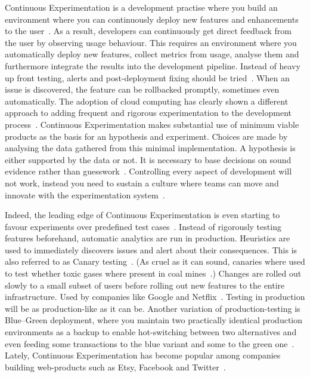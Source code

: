 \documentclass[english]{tktltiki2}
\begin{document}
Continuous Experimentation is a development practise where you build an environment where you can continuously deploy new features and enhancements to the user~\cite{FGM14}. As a result, developers can continuously get direct feedback from the user by observing usage behaviour. This requires an environment where you automatically deploy new features, collect metrics from usage, analyse them and furthermore integrate the results into the development pipeline. Instead of heavy up front testing, alerts and post-deployment fixing should be tried~\cite{FGM14}. When an issue is discovered, the feature can be rollbacked promptly, sometimes even automatically. The adoption of cloud computing has clearly shown a different approach to adding frequent and rigorous experimentation to the development process~\cite{Bos12}. Continuous Experimentation makes substantial use of minimum viable products as the basis for an hypothesis and experiment. Choices are made by analysing the data gathered from this minimal implementation. A hypothesis is either supported by the data or not. It is necessary to base decisions on sound evidence rather than guesswork~\cite{FGM14}. Controlling every aspect of development will not work, instead you need to sustain a culture where teams can move and innovate with the experimentation system~\cite{Rie11}.

Indeed, the leading edge of Continuous Experimentation is even starting to favour experiments over predefined test cases~\cite{New15}. Instead of rigorously testing features beforehand, automatic analytics are run in production. Heuristics are used to immediately discovers issues and alert about their consequences. This is also referred to as Canary testing~\cite{HF11, Sat14}. (As cruel as it can sound, canaries where used to test whether toxic gases where present in coal mines~\cite{Sat14}.) Changes are rolled out slowly to a small subset of users before rolling out new features to the entire infrastructure. Used by companies like Google and Netflix~\cite{Whi11, Sch13}. Testing in production will be as production-like as it can be. Another variation of production-testing is Blue–Green deployment, where you maintain two practically identical production environments as a backup to enable hot-switching between two alternatives and even feeding some transactions to the blue variant and some to the green one~\cite{Fow10, HF11}. Lately, Continuous Experimentation has become popular among companies building web-products such as Etsy, Facebook and Twitter~\cite{McK12, Boh13, New13, Rho14, Wan14}.
\end{document}
